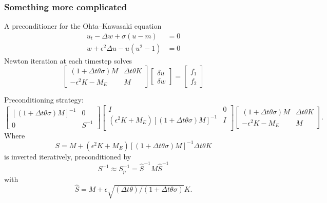 \documentclass[presentation,aspectratio=43]{beamer}
\begin{document}
\begin{frame}[allowframebreaks]
  \frametitle{Something more complicated}
  A preconditioner for the Ohta--Kawasaki equation
  \parencite{Farrell:2017}
  \begin{equation*}
    \begin{split}
      u_t - \Delta w + \sigma(u - m) &= 0\\
      w + \epsilon^2 \Delta u - u(u^2 - 1) &= 0
    \end{split}
  \end{equation*}
  Newton iteration at each timestep solves
  \begin{equation*}
    \begin{bmatrix}
      (1 + \Delta t \theta \sigma)M  & \Delta t\theta K \\
      -\epsilon^2 K - M_E & M
    \end{bmatrix}
    \begin{bmatrix}
      \delta u \\
      \delta w
    \end{bmatrix} =
    \begin{bmatrix}
      f_1 \\
      f_2
    \end{bmatrix}
  \end{equation*}
  \pagebreak

  Preconditioning strategy:
  {\scriptsize
    \begin{equation*}
      \begin{bmatrix}
        \left[(1 + \Delta t \theta \sigma)M\right]^{-1}  & 0 \\
        0 & S^{-1}
      \end{bmatrix}
      \begin{bmatrix}
        I & 0\\
        (\epsilon^2 K + M_E)\left[(1 + \Delta t \theta
          \sigma)M\right]^{-1} & I\\
      \end{bmatrix}
      \begin{bmatrix}
        (1 + \Delta t \theta \sigma)M  & \Delta t\theta K \\
        -\epsilon^2 K - M_E & M
      \end{bmatrix}.
    \end{equation*}
  }
  Where
  \begin{equation*}
    S = M + (\epsilon^2 K + M_E) \left[(1 + \Delta t\theta\sigma)M\right]^{-1} \Delta t \theta K
  \end{equation*}
  is inverted iteratively, preconditioned by
  \begin{equation*}
    S^{-1} \approx S_p^{-1} = \hat{S}^{-1}M\hat{S}^{-1}
  \end{equation*}
  with
  \begin{equation*}
    \hat{S} = M + \epsilon\sqrt{(\Delta t \theta)/(1+\Delta t \theta\sigma)} K.
  \end{equation*}
\end{frame}
\end{document}

